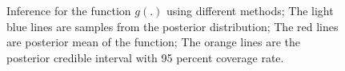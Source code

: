 \documentclass{article}
\begin{document}
\begin{figure}[p]
{    }
    \caption{Inference for the function $g(.)$ using different methods; The light blue lines are samples from the posterior distribution; The red lines are posterior mean of the function; The orange lines are the posterior credible interval with 95 percent coverage rate.}
    \label{fig:sim2func}
\end{figure}


\begin{figure}[p]
    \centering
\end{figure}
\end{document}
